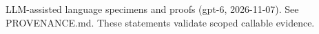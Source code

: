 \documentclass[11pt]{article}
\begin{document}

\bigskip
{\footnotesize LLM-assisted language specimens and proofs (gpt-6, 2026-11-07).
See PROVENANCE.md. These statements validate scoped callable evidence.}
\end{document}
